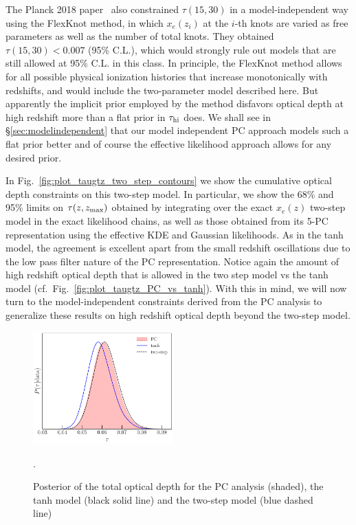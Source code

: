 \documentclass[prd,twocolumn,amsmath,amssymb,floatfix,superscriptaddress,nofootinbib]{revtex4-1}
\newcommand{\zmax}{z_{\rm max}}
\begin{document}
The Planck 2018 paper~\cite{Aghanim:2018eyx} also constrained $\tau(15, 30)$ in a model-independent way using the FlexKnot method, in which $x_e(z_i)$ at the $i$-th knots are varied as free parameters as well as the number of total knots. They obtained $\tau(15, 30) < 0.007$ (95\% C.L.), which would strongly rule out models that are still allowed at 95\% C.L. in this class. 
 In principle, the FlexKnot method allows for all possible physical ionization histories that increase monotonically with redshifts, and would include the two-parameter model described here. But apparently the implicit prior employed by the method disfavors optical depth at high redshift more than a flat prior in 
$\tau_{\rm hi}$ does.  We shall see in \S \ref{sec:modelindependent} that our model independent PC approach models such a flat prior better and of course the effective likelihood approach allows for any desired prior.


In Fig.~\ref{fig:plot_taugtz_two_step_contours} we show the cumulative optical depth constraints on this two-step model. In particular, we show the 68\% and 95\% limits on $\tau(z, \zmax)$ obtained by integrating over the exact $x_e(z)$ two-step model in the exact likelihood chains, as well as those obtained from its 5-PC representation using the effective KDE and Gaussian likelihoods.   
As in the tanh model, the agreement is excellent apart from the small redshift oscillations due to the low pass filter nature of the PC representation.  Notice again the amount of high redshift optical depth that is allowed in the two step model vs the tanh model (cf.~Fig.~\ref{fig:plot_taugtz_PC_vs_tanh}).
With this in mind, we will now turn to the model-independent constraints derived from the PC analysis to generalize these results on high redshift optical depth beyond the two-step model.

\begin{figure}[ht]
\includegraphics[width=0.48\textwidth]
{paper/plots/pl18_tau_posterior_tanh_vs_tanh_highz_vs_pc_dz_auto_zre_prior_6p1_normalized_by_max.pdf}
\caption{Posterior of the total optical depth for the PC analysis (shaded), the tanh model (black solid line) and the two-step model (blue dashed line)}. 
\label{fig:plot_tau_posterior_PC_vs_tanh_vs_tanh_highz}
\label{fig:tauPC}
\end{figure}
\end{document}
